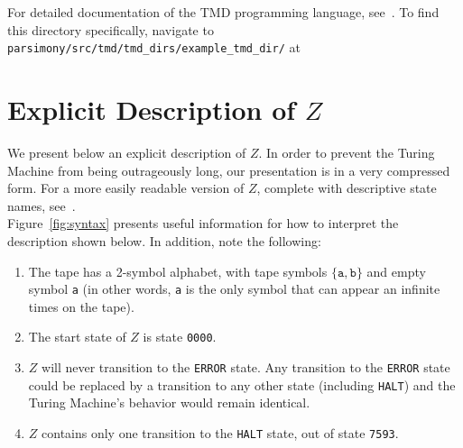 \documentclass[11pt]{article}
\newcommand{\zhaltstate}{\texttt{7593}}
\begin{document}
\begin{appendices}
For detailed documentation of the TMD programming language, see~\cite{github}. To find this directory specifically, navigate to \texttt{parsimony/src/tmd/tmd\_dirs/example\_tmd\_dir/} at~\cite{github}

\section{Explicit Description of $Z$ \label{sec:explicitz}}

We present below an explicit description of $Z$. In order to prevent the Turing Machine from being outrageously long, our presentation is in a very compressed form. For a more easily readable version of $Z$, complete with descriptive state names, see~\cite{github}. \\

Figure~\ref{fig:syntax} presents useful information for how to interpret the description shown below. In addition, note the following:

\begin{enumerate}

\item The tape has a 2-symbol alphabet, with tape symbols $\{\texttt{a}, \texttt{b}\}$ and empty symbol \texttt{a} (in other words, \texttt{a} is the only symbol that can appear an infinite times on the tape).
\item The start state of $Z$ is state \texttt{0000}.
\item $Z$ will never transition to the \texttt{ERROR} state. Any transition to the \texttt{ERROR} state could be replaced by a transition to any other state (including \texttt{HALT}) and the Turing Machine's behavior would remain identical.
\item $Z$ contains only one transition to the \texttt{HALT} state, out of state \zhaltstate.

\end{enumerate}


\end{appendices}
\end{document}
